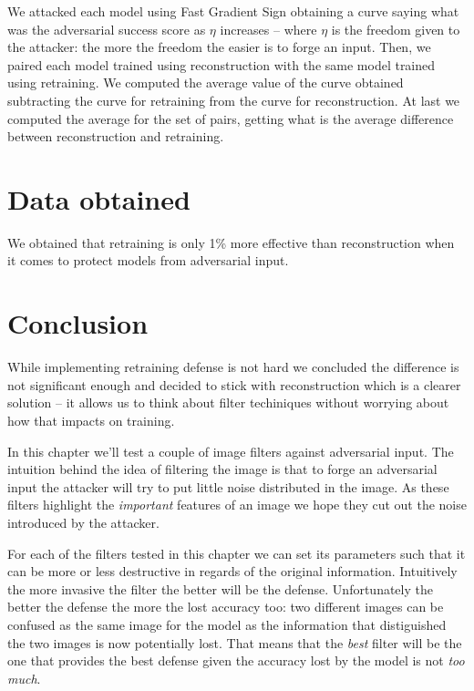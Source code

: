 We attacked each model using Fast Gradient Sign obtaining a curve
saying what was the adversarial success score as $\eta$ increases --
where $\eta$ is the freedom given to the attacker: the more the freedom
the easier is to forge an input. Then, we paired each model trained
using reconstruction with the same model trained using retraining. We
computed the average value of the curve obtained subtracting the curve
for retraining from the curve for reconstruction. At last we computed
the average for the set of pairs, getting what is the average difference
between reconstruction and retraining.

\section{Data obtained}
We obtained that retraining is only 1\% more effective than reconstruction
when it comes to protect models from adversarial input.

\section{Conclusion}
While implementing retraining defense is not hard we concluded the
difference is not significant enough and decided to stick with
reconstruction which is a clearer solution -- it allows us to think about
filter techiniques without worrying about how that impacts on training.


In this chapter we'll test a couple of image filters against
adversarial input. The intuition behind the idea of filtering the image
is that to forge an adversarial input the attacker will try to put
little noise distributed in the image. As these filters highlight the
\emph{important} features of an image we hope they cut out the noise
introduced by the attacker.

For each of the filters tested in this chapter we can set its
parameters such that it can be more or less destructive in regards of
the original information. Intuitively the more invasive the filter the
better will be the defense. Unfortunately the better the defense the
more the lost accuracy too: two different images can be confused as the
same image for the model as the information that distiguished the two
images is now potentially lost. That means that the \emph{best} filter
will be the one that provides the best defense given the accuracy lost
by the model is not \emph{too much}.

